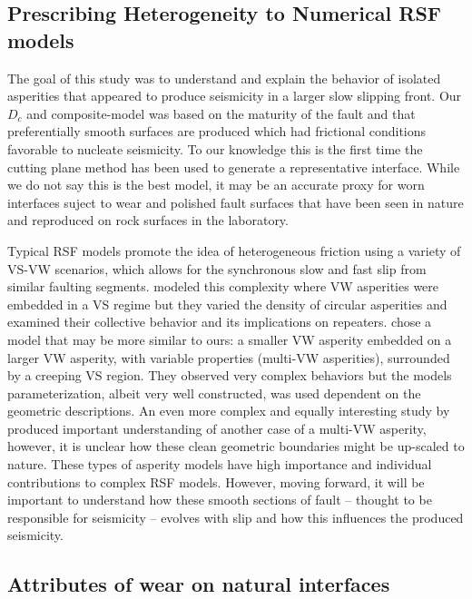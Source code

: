 \documentclass[preprint,1p, 10pt,authoryear]{elsarticle}
\begin{document}
\subsection{Prescribing Heterogeneity to Numerical RSF models}

The goal of this study was to understand and explain the behavior of isolated asperities that appeared to produce seismicity in a larger slow slipping front. Our $D_{c}$ and composite-model was based on the maturity of the fault and that preferentially smooth surfaces are produced which had frictional conditions favorable to nucleate seismicity.  To our knowledge this is the first time the cutting plane method has been used to generate a representative interface.  While we do not say this is the best model, it may be an accurate proxy for worn interfaces suject to wear and polished fault surfaces that have been seen in nature and reproduced on rock surfaces in the laboratory.  

Typical RSF models promote the idea of heterogeneous friction using a variety of VS-VW scenarios, which allows for the synchronous slow and fast slip from similar faulting segments. \citet{Dublanchet2013} modeled this complexity where VW asperities were embedded in a VS regime but they varied the density of circular asperities and examined their collective behavior and its implications on repeaters. \citet{Noda2013} chose a model that may be more similar to ours: a smaller VW asperity embedded on a larger VW asperity, with variable properties (multi-VW asperities), surrounded by a creeping VS region.  They observed very complex behaviors but the models parameterization, albeit very well constructed, was used dependent on the geometric descriptions. An even more complex and equally interesting study by \citet{Schaal2019} produced important understanding of another case of a multi-VW asperity, however, it is unclear how these clean geometric boundaries might be up-scaled to nature.  These types of asperity models have high importance and individual contributions to complex RSF models. However, moving forward, it will be important to understand how these smooth sections of fault -- thought to be responsible for seismicity -- evolves with slip and how this influences the produced seismicity. 

\subsection{Attributes of wear on natural interfaces}
\label{wear}
\end{document}
